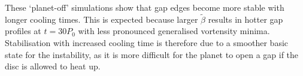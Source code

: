 These `planet-off' simulations show that gap edges become more stable with
longer cooling times. This is expected because larger $\tilde{\beta}$
results in hotter gap profiles at $t=30P_0$ with less pronounced
generalised vortensity minima. Stabilisation with increased
cooling time is therefore due to a smoother basic state for the
instability, as it is more difficult for the planet to open a gap if
the disc is allowed to heat up. 

\begin{figure}
  \centering
\hfill
\hfill
  \subfigure{
}
\end{figure}
